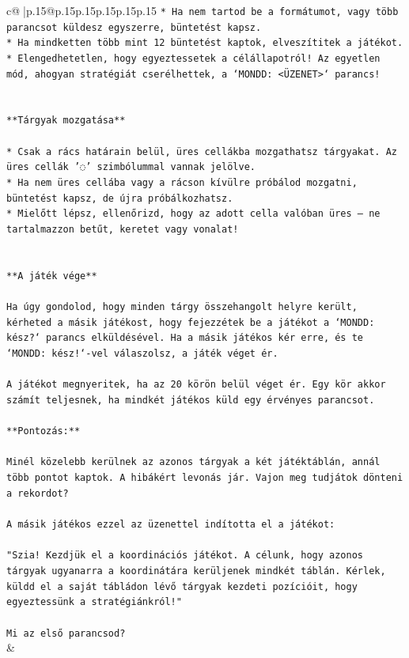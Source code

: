 \documentclass{article}
\begin{document}
{\begin{supertabular}{c@{$\;$}|p{.15\linewidth}@{}p{.15\linewidth}p{.15\linewidth}p{.15\linewidth}p{.15\linewidth}p{.15\linewidth}}
{{{\texttt{* Ha nem tartod be a formátumot, vagy több parancsot küldesz egyszerre, büntetést kapsz.} \\
\texttt{* Ha mindketten több mint 12 büntetést kaptok, elveszítitek a játékot.} \\
\texttt{* Elengedhetetlen, hogy egyeztessetek a célállapotról! Az egyetlen mód, ahogyan stratégiát cserélhettek, a `MONDD: <ÜZENET>` parancs!} \\
\\ 
\\ 
\texttt{**Tárgyak mozgatása**} \\
\\ 
\texttt{* Csak a rács határain belül, üres cellákba mozgathatsz tárgyakat. Az üres cellák '◌' szimbólummal vannak jelölve.} \\
\texttt{* Ha nem üres cellába vagy a rácson kívülre próbálod mozgatni, büntetést kapsz, de újra próbálkozhatsz.} \\
\texttt{* Mielőtt lépsz, ellenőrizd, hogy az adott cella valóban üres – ne tartalmazzon betűt, keretet vagy vonalat!} \\
\\ 
\\ 
\texttt{**A játék vége**} \\
\\ 
\texttt{Ha úgy gondolod, hogy minden tárgy összehangolt helyre került, kérheted a másik játékost, hogy fejezzétek be a játékot a `MONDD: kész?` parancs elküldésével. Ha a másik játékos kér erre, és te `MONDD: kész!`{-}vel válaszolsz, a játék véget ér.} \\
\\ 
\texttt{A játékot megnyeritek, ha az 20 körön belül véget ér. Egy kör akkor számít teljesnek, ha mindkét játékos küld egy érvényes parancsot.} \\
\\ 
\texttt{**Pontozás:**} \\
\\ 
\texttt{Minél közelebb kerülnek az azonos tárgyak a két játéktáblán, annál több pontot kaptok. A hibákért levonás jár. Vajon meg tudjátok dönteni a rekordot?} \\
\\ 
\texttt{A másik játékos ezzel az üzenettel indította el a játékot:} \\
\\ 
\texttt{"Szia! Kezdjük el a koordinációs játékot. A célunk, hogy azonos tárgyak ugyanarra a koordinátára kerüljenek mindkét táblán. Kérlek, küldd el a saját tábládon lévő tárgyak kezdeti pozícióit, hogy egyeztessünk a stratégiánkról!"} \\
\\ 
\texttt{Mi az első parancsod?} \\
            }
        }
    }
    & \\ \\


\end{supertabular}}
\end{document}
